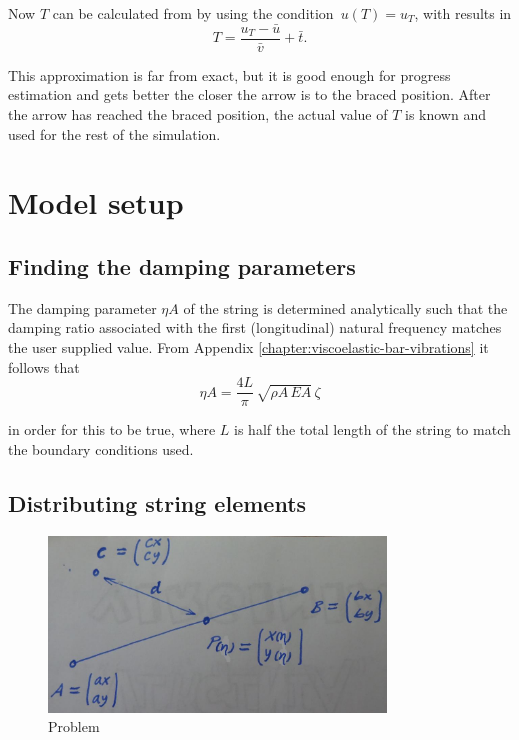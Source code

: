 Now $T$ can be calculated from by using the condition~$u(T) = u_T$, with results in
\begin{equation}
T = \frac{u_T - \bar{u}}{\bar{v}} + \bar{t}.
\end{equation}

This approximation is far from exact, but it is good enough for progress estimation and gets better the closer the arrow is to the braced position.
After the arrow has reached the braced position, the actual value of $T$ is known and used for the rest of the simulation.

\newpage
\section{Model setup}

\subsection{Finding the damping parameters}

The damping parameter $\eta A$ of the string is determined analytically such that the damping ratio associated with the first (longitudinal) natural frequency matches the user supplied value. From Appendix \ref{chapter:viscoelastic-bar-vibrations} it follows that
%
\begin{equation}
\eta A = \frac{4L}{\pi}\,\sqrt{\rho A\,EA}\,\zeta
\end{equation}

in order for this to be true, where $L$ is half the total length of the string to match the boundary conditions used.

\subsection{Distributing string elements}

\begin{figure}[h]
\centering
\includegraphics[width=0.8\textwidth]{figures/setup/line-distance}
\caption{Problem}
\label{fig:solution:dynamic_progress}
\end{figure}

